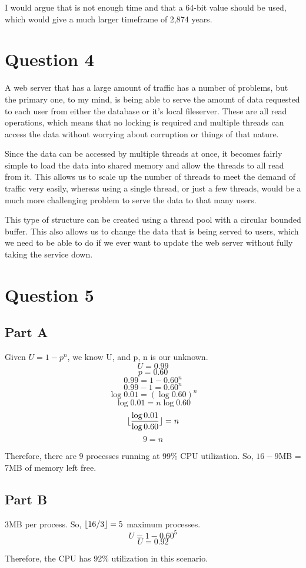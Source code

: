 \documentclass[12pt]{article}
\DeclarePairedDelimiter\floor{\lfloor}{\rfloor}
\begin{document}
  I would argue that is not enough time and that a 64-bit value should be used, which would give a much larger timeframe of 2,874 years.
  
  \section*{Question 4}  
  A web server that has a large amount of traffic has a number of problems, but the primary one, to my mind, is being able to serve the amount of data requested to each user from either the database or it's local fileserver. These are all read operations, which means that no locking is required and multiple threads can access the data without worrying about corruption or things of that nature.
  
  Since the data can be accessed by multiple threads at once, it becomes fairly simple to load the data into shared memory and allow the threads to all read from it. This allows us to scale up the number of threads to meet the demand of traffic very easily, whereas using a single thread, or just a few threads, would be a much more challenging problem to serve the data to that many users. 
  
  This type of structure can be created using a thread pool with a circular bounded buffer. This also allows us to change the data that is being served to users, which we need to be able to do if we ever want to update the web server without fully taking the service down.   
  
  
  \section*{Question 5}
  
  \subsection*{Part A}
  Given $U = 1-p^n$, we know U, and p, n is our unknown.
  $$U = 0.99$$
  $$p=0.60$$
  $$0.99 = 1-0.60^n$$
  $$0.99-1=0.60^n$$
  $$\log 0.01 = (\log 0.60)^n$$
  $$\log0.01=n\log0.60$$
  $$\floor{\frac{\log0.01}{\log0.60}} = n$$
  $$9 = n$$
  
  Therefore, there are 9 processes running at 99\% CPU utilization. So, $16-9$MB = 7MB of memory left free.
  
  \subsection*{Part B}
  3MB per process. So, $\floor{16/3} = 5$ maximum processes.
  $$U = 1 - 0.60^5$$
  $$U = 0.92$$
  
  Therefore, the CPU has 92\% utilization in this scenario.
  
  
  
\end{document}
